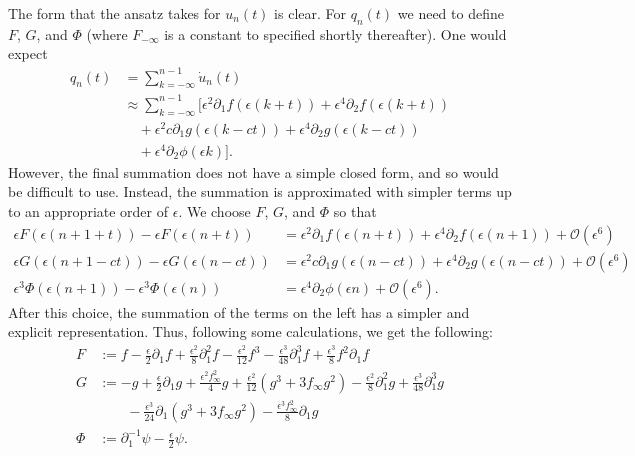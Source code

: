 The form that the ansatz takes for \(u_n(t)\) is clear. For \(q_n(t)\) we need to define \(F\), \(G\), and \(\Phi\) (where \(F_{-\infty}\) is a constant to specified shortly thereafter). One would expect  
\begin{equation}
	\begin{aligned}
		q_n(t) &= \sum_{k=-\infty}^{n-1} \dot u_n(t) \\
		&\approx \sum_{k=-\infty}^{n-1} [ \epsilon^2 \partial_1 f (\epsilon(k+t) ) + \epsilon^4 \partial_2 f(\epsilon(k+t)) \\
		&\quad+ \epsilon^2 c \partial_1 g(\epsilon (k-ct))  +\epsilon^4 \partial_2 g(\epsilon(k-ct)) \\
		&\quad+ \epsilon^4 \partial_2 \phi(\epsilon k) ].
	\end{aligned}
\end{equation}
However, the final summation does not have a simple closed form, and so would be difficult to use. Instead, the summation is approximated with simpler terms up to an appropriate order of \(\epsilon\). We choose \(F\), \(G\), and \(\Phi\) so that 
\begin{equation}
	\begin{aligned}
		\epsilon F(\epsilon (n+1 + t)) - \epsilon F(\epsilon(n+t)) &= \epsilon^2 \partial_1 f(\epsilon(n+t)) + \epsilon^4 \partial_2 f(\epsilon (n+1)) + \mathcal O(\epsilon^6) \\
		\epsilon G(\epsilon(n+1 -ct)) - \epsilon G(\epsilon(n-ct)) &=  \epsilon^2 c \partial_1 g(\epsilon (n-ct))  +\epsilon^4 \partial_2 g(\epsilon(n-ct)) + \mathcal O(\epsilon^6) \\
		\epsilon^3 \Phi(\epsilon(n+1)) - \epsilon^3 \Phi(\epsilon(n)) &= \epsilon^4 \partial_2 \phi(\epsilon n) + \mathcal O(\epsilon^6) .
	\end{aligned}
\end{equation}
After this choice, the summation of the terms on the left has a simpler and explicit representation. Thus, following some calculations, we get the following:
\begin{align}
	F &:= f - \frac{\epsilon} 2 \partial_1 f + \frac{\epsilon^2} 8 \partial_1^2 f - \frac{\epsilon^2}{12} f^3  - \frac{\epsilon^3}{48} \partial_1^3 f + \frac{\epsilon^3} 8 f^2 \partial_1 f\\
	G &:= - g + \frac{\epsilon}{2}\partial_1 g + \frac{\epsilon^2 f_\infty^2} 4  g + \frac{\epsilon^2}{12}(g^3 + 3f_\infty g^2) -\frac{ \epsilon^2} 8 \partial_1^2 g  + \frac{\epsilon^3}{48} \partial_1^3 g \\
	&\qquad - \frac{\epsilon^3}{24} \partial_1(g^3 + 3f_\infty g^2) - \frac{\epsilon^3 f_\infty^2} 8 \partial_1 g \nonumber \\
	\Phi &:=  \partial_1^{-1}\psi - \frac{\epsilon} 2 \psi.
\end{align}
